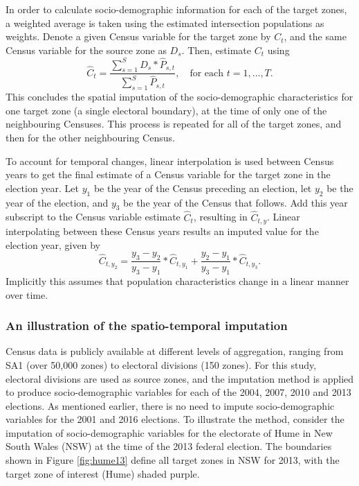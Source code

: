 \documentclass[times, doublespace]{anzsauth}
\begin{document}
In order to calculate socio-demographic information for each of the target zones, a weighted average is taken using the estimated intersection populations as weights. Denote a given Census variable for the target zone by \(C_t\), and the same Census variable for the source zone as \(D_s\). Then, estimate \(C_t\) using
\[
  \hat{C}_t = \frac{\sum_{s=1}^{S}{D_s*\hat{P}_{s,t}}}%
  {\sum_{s=1}^{S}{\hat{P}_{s,t}}},
  \quad\text{for each $t=1,\dots,T$}.
\]
This concludes the spatial imputation of the socio-demographic characteristics for one target zone (a single electoral boundary), at the time of only one of the neighbouring Censuses. This process is repeated for all of the target zones, and then for the other neighbouring Census.

\enlargethispage*{0.5cm}

To account for temporal changes, linear interpolation is used between Census years to get the final estimate of a Census variable for the target zone in the election year. Let \(y_1\) be the year of the Census preceding an election, let \(y_2\) be the year of the election, and \(y_3\) be the year of the Census that follows. Add this year subscript to the Census variable estimate \(\hat{C}_t\), resulting in \(\hat{C}_{t,y}\). Linear interpolating between these Census years results an imputed value for the election year, given by
\[
  \hat{C}_{t,y_2} = \frac{y_3-y_2}{y_3-y_1} * \hat{C}_{t,y_1} +
    \frac{y_2-y_1}{y_3-y_1} * \hat{C}_{t,y_3}.
\]
Implicitly this assumes that population characteristics change in a linear manner over time.

\hypertarget{an-illustration-of-the-spatio-temporal-imputation}{%
\subsubsection*{An illustration of the spatio-temporal imputation}\label{an-illustration-of-the-spatio-temporal-imputation}}

Census data is publicly available at different levels of aggregation, ranging from SA1 (over 50,000 zones) to electoral divisions (150 zones). For this study, electoral divisions are used as source zones, and the imputation method is applied to produce socio-demographic variables for each of the 2004, 2007, 2010 and 2013 elections. As mentioned earlier, there is no need to impute socio-demographic variables for the 2001 and 2016 elections. To illustrate the method, consider the imputation of socio-demographic variables for the electorate of Hume in New South Wales (NSW) at the time of the 2013 federal election. The boundaries shown in Figure \ref{fig:hume13} define all target zones in NSW for 2013, with the target zone of interest (Hume) shaded purple.
\end{document}
